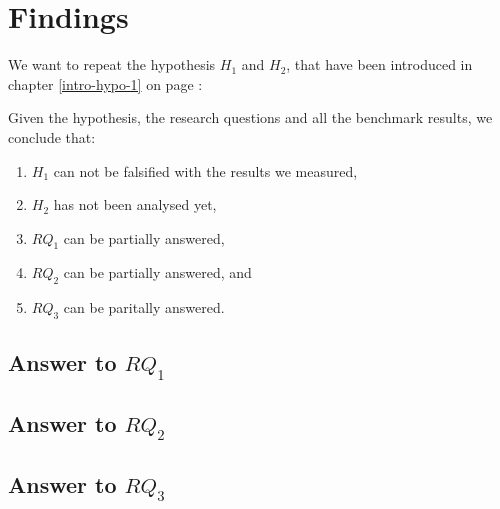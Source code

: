 \section{Findings}

We want to repeat the hypothesis $H_1$ and $H_2$, that have been introduced in chapter \ref{intro-hypo-1} on page \pageref{intro-hypo-1}:


Given the hypothesis, the research questions and all the benchmark results, we conclude that:

\begin{enumerate}
\item $H_1$ can not be falsified with the results we measured,
\item $H_2$ has not been analysed yet,
\item $RQ_1$ can be partially answered,
\item $RQ_2$ can be partially answered, and
\item $RQ_3$ can be paritally answered.
\end{enumerate}

\subsection{Answer to $RQ_1$}


\subsection{Answer to $RQ_2$}


\subsection{Answer to $RQ_3$}


